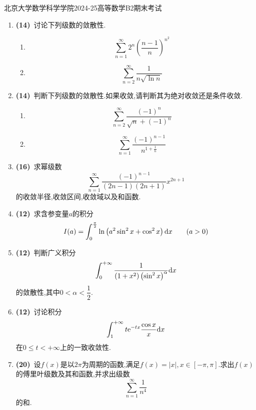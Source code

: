 \documentclass{ctexart}
\begin{document}
\pagestyle{empty}
\begin{center}\Large
    北京大学数学科学学院2024-25高等数学B2期末考试
\end{center}
\begin{enumerate}[leftmargin=*,label=\textbf{\arabic*.},topsep=0pt,parsep=0pt,itemsep=0pt,partopsep=0pt]
    \item \textbf{(14)}\ 讨论下列级数的敛散性.
        \begin{enumerate}[label=\tbf{(\arabic*)},topsep=0pt,parsep=0pt,itemsep=0pt,partopsep=0pt]
            \item \[\sum_{n=1}^{\infty}2^n\left(\dfrac{n-1}{n}\right)^{n^2}\]
            \item \[\sum_{n=2}^{\infty}\dfrac{1}{n\sqrt{\ln n}}\]
        \end{enumerate}

    \item \textbf{(14)}\ 判断下列级数的敛散性.如果收敛,请判断其为绝对收敛还是条件收敛.
        \begin{enumerate}[label=\tbf{(\arabic*)},topsep=0pt,parsep=0pt,itemsep=0pt,partopsep=0pt]
            \item \[\sum_{n=2}^{\infty}\dfrac{(-1)^n}{\sqrt{n}+(-1)^n}\]
            \item \[\sum_{n=1}^{\infty}\dfrac{(-1)^{n-1}}{n^{1+\frac1n}}\]
        \end{enumerate}

    \item \textbf{(16)}\ 求幂级数
        \[\sum_{n=1}^{\infty}\dfrac{(-1)^{n-1}}{(2n-1)(2n+1)}x^{2n+1}\]
        的收敛半径,收敛区间,收敛域以及和函数.

    \item \textbf{(12)}\ 求含参变量$a$的积分
        \[I(a)=\int_0^{\frac\pi2}\ln\left(a^2\sin^2x+\cos^2x\right)\mathrm{d} x\qquad(a>0)\]
        
    \item \textbf{(12)}\ 判断广义积分
        \[\int_0^{+\infty}\dfrac{1}{\left(1+x^2\right)\left(\sin^2 x\right)^\alpha}\mathrm{d} x\]
        的敛散性,其中$0<\alpha<\dfrac12$.

    \item \textbf{(12)}\ 讨论积分
        \[\int_1^{+\infty}t\mathrm{e}^{-tx}\dfrac{\cos x}{x}\mathrm{d} x\]
        在$0\leqslant t<+\infty$上的一致收敛性.

    \item \textbf{(20)}\ 设$f(x)$是以$2\pi$为周期的函数,满足$f(x)=|x|,x\in[-\pi,\pi]$.求出$f(x)$的傅里叶级数及其和函数,并求出级数
        \[\sum_{n=1}^{\infty}\dfrac{1}{n^4}\]
        的和.
    
\end{enumerate}
\end{document}

